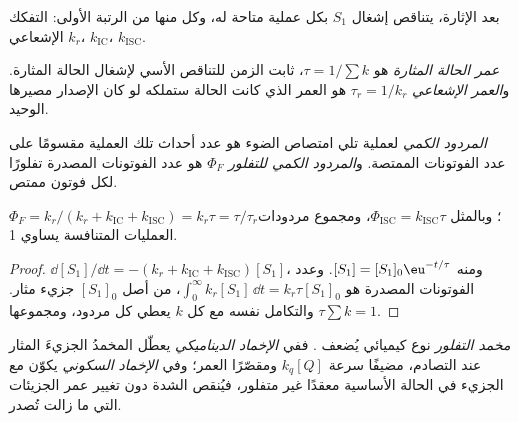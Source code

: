 بعد الإثارة، يتناقص إشغال $S_1$ بكل عملية متاحة له،
وكل منها من الرتبة الأولى: التفكك الإشعاعي $k_r$،  $k_{\mathrm{IC}}$،
 $k_{\mathrm{ISC}}$.

\begin{definition}\label{def:b3:electronic-spectroscopy:lifetime}
\emph{عمر الحالة المثارة} هو $\tau =
1/\sum k$، ثابت الزمن للتناقص الأسي لإشغال الحالة
المثارة. و\emph{العمر الإشعاعي} $\tau_r =
1/k_r$ هو العمر الذي كانت الحالة ستملكه لو كان الإصدار مصيرها
الوحيد.
\end{definition}

\begin{definition}\label{def:b3:electronic-spectroscopy:quantum-yield}
\emph{المردود الكمي} لعملية تلي
امتصاص الضوء هو عدد أحداث تلك العملية مقسومًا على
عدد الفوتونات الممتصة. و\emph{المردود الكمي
للتفلور} $\Phi_F$ هو عدد الفوتونات
المصدرة تفلورًا لكل فوتون ممتص.
\end{definition}

\begin{proposition}\label{prop:b3:electronic-spectroscopy:quantum-yield}
$\Phi_F = k_r/(k_r + k_{\mathrm{IC}} + k_{\mathrm{ISC}}) = k_r\tau = \tau/\tau_r$؛ وبالمثل
$\Phi_{\mathrm{ISC}} = k_{\mathrm{ISC}}\tau$، ومجموع مردودات العمليات المتنافسة
يساوي 1.
\end{proposition}

\begin{proof}
$\dd[S_1]/\dd t = -(k_r + k_{\mathrm{IC}} + k_{\mathrm{ISC}})[S_1]$، ومنه $[S_1] = [S_1]_0\eu^{-t/\tau}$.
وعدد الفوتونات المصدرة هو $\int_0^\infty k_r[S_1]\,\dd t = k_r\tau[S_1]_0$، من أصل
$[S_1]_0$ جزيء مثار. والتكامل نفسه مع كل $k$ يعطي كل مردود،
ومجموعها $\tau\sum k = 1$.
\end{proof}

\begin{definition}\label{def:b3:electronic-spectroscopy:quencher}
\emph{مخمد التفلور} نوع كيميائي
يُضعف . ففي \emph{الإخماد الديناميكي}
يعطّل المخمدُ الجزيءَ المثار عند التصادم، مضيفًا سرعة $k_q[Q]$ 
ومقصّرًا العمر؛ وفي \emph{الإخماد السكوني}
يكوّن مع الجزيء في الحالة الأساسية معقدًا غير متفلور، فيُنقص
الشدة دون تغيير عمر الجزيئات التي ما زالت تُصدر.
\end{definition}

